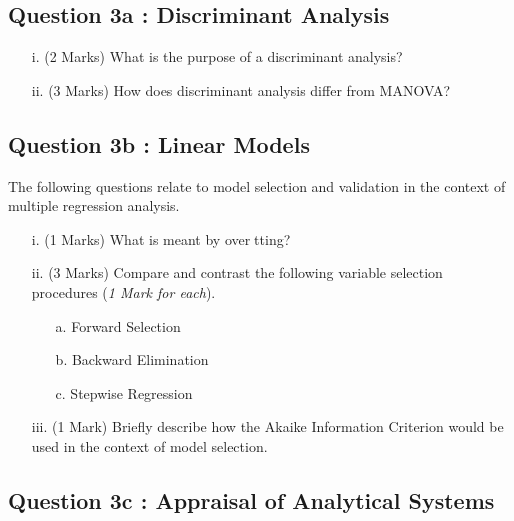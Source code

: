 \documentclass[a4paper,12pt]{article}
\begin{document}

\newpage
\subsection*{Question 3a : Discriminant Analysis} %

\begin{itemize}
\item[i.](2 Marks) What is the purpose of a discriminant analysis?
\item[ii.](3 Marks) How does discriminant analysis differ from MANOVA?
\end{itemize}

\subsection*{Question 3b : Linear Models} %
The following questions relate to model selection and validation in the context of multiple
regression analysis.
\begin{itemize}
\item[i.](1 Marks) What is meant by overtting?
\item[ii.](3 Marks) Compare and contrast the following variable selection procedures (\textit{1 Mark for each}).
\begin{itemize}
    \item[a.] Forward Selection
    \item[b.] Backward Elimination
    \item[c.] Stepwise Regression
    \end{itemize}
\item[iii.](1 Mark) Briefly describe how the Akaike Information Criterion would be used in the context of model selection.
\end{itemize}

\subsection*{Question 3c : Appraisal of Analytical Systems}
\end{document}
